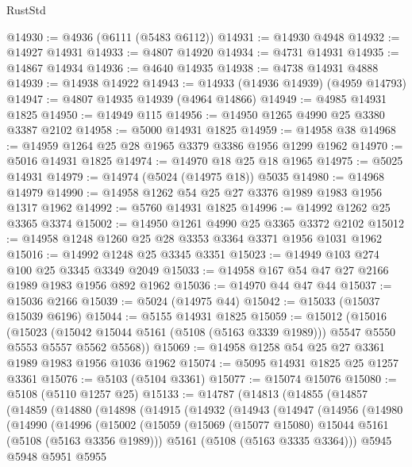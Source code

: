 \begin{lexlean}{RustStd}
\begin{coremodule}
@14930 := @4936 (@6111 (@5483 @6112))
@14931 := @14930 @4948
@14932 := @14927 @14931
@14933 := @4807 @14920
@14934 := @4731 @14931
@14935 := @14867 @14934
@14936 := @4640 @14935
@14938 := @4738 @14931 @4888
@14939 := @14938 @14922
@14943 := @14933 (@14936 @14939) (@4959 @14793)
@14947 := @4807 @14935 @14939 (@4964 @14866)
@14949 := @4985 @14931 @1825
@14950 := @14949 @115
@14956 := @14950 @1265 @4990 @25 @3380 @3387 @2102
@14958 := @5000 @14931 @1825
@14959 := @14958 @38
@14968 := @14959 @1264 @25 @28 @1965 @3379 @3386 @1956 @1299 @1962
@14970 := @5016 @14931 @1825
@14974 := @14970 @18 @25 @18 @1965
@14975 := @5025 @14931
@14979 := @14974 (@5024 (@14975 @18)) @5035
@14980 := @14968 @14979
@14990 := @14958 @1262 @54 @25 @27 @3376 @1989 @1983 @1956 @1317 @1962
@14992 := @5760 @14931 @1825
@14996 := @14992 @1262 @25 @3365 @3374
@15002 := @14950 @1261 @4990 @25 @3365 @3372 @2102
@15012 := @14958 @1248 @1260 @25 @28 @3353 @3364 @3371 @1956 @1031 @1962
@15016 := @14992 @1248 @25 @3345 @3351
@15023 := @14949 @103 @274 @100 @25 @3345 @3349 @2049
@15033 := @14958 @167 @54 @47 @27 @2166 @1989 @1983 @1956 @892 @1962
@15036 := @14970 @44 @47 @44
@15037 := @15036 @2166
@15039 := @5024 (@14975 @44)
@15042 := @15033 (@15037 @15039 @6196)
@15044 := @5155 @14931 @1825
@15059 := @15012
    (@15016
      (@15023
        (@15042 @15044 @5161 (@5108 (@5163 @3339 @1989)))
        @5547
        @5550
        @5553
        @5557
        @5562
        @5568))
@15069 := @14958 @1258 @54 @25 @27 @3361 @1989 @1983 @1956 @1036 @1962
@15074 := @5095 @14931 @1825 @25 @1257 @3361
@15076 := @5103 (@5104 @3361)
@15077 := @15074 @15076
@15080 := @5108 (@5110 @1257 @25)
@15133 := @14787
    (@14813
      (@14855
        (@14857
          (@14859
            (@14880
              (@14898
                (@14915
                  (@14932
                    (@14943
                      (@14947
                        (@14956
                          (@14980
                            (@14990
                              (@14996
                                (@15002
                                  (@15059
                                    (@15069
                                      (@15077 @15080)
                                      @15044
                                      @5161
                                      (@5108 (@5163 @3356 @1989)))
                                    @5161
                                    (@5108 (@5163 @3335 @3364)))
                                  @5945
                                  @5948
                                  @5951
                                  @5955

\end{coremodule}
\end{lexlean}
